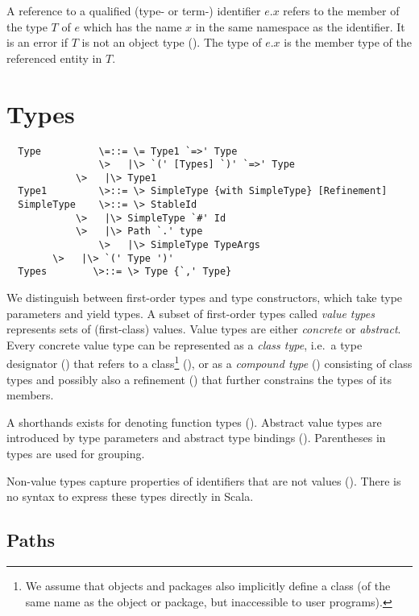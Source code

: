 \documentclass[11pt]{report}
\begin{document}
A reference to a qualified (type- or term-) identifier $e.x$ refers to
the member of the type $T$ of $e$ which has the name $x$ in the same
namespace as the identifier. It is an error if $T$ is not an object type
(). The type of $e.x$ is the member type of the
referenced entity in $T$.

\chapter{\label{sec:types}Types}

\syntax\begin{verbatim}
  Type          \=::= \= Type1 `=>' Type
                \>   |\> `(' [Types] `)' `=>' Type
	        \>   |\> Type1
  Type1         \>::= \> SimpleType {with SimpleType} [Refinement]
  SimpleType   	\>::= \> StableId
	        \>   |\> SimpleType `#' Id
	        \>   |\> Path `.' type
                \>   |\> SimpleType TypeArgs
		\>   |\> `(' Type ')'
  Types	       \>::= \> Type {`,' Type}
\end{verbatim}

We distinguish between first-order types and type constructors, which
take type parameters and yield types. A subset of first-order types
called {\em value types} represents sets of (first-class) values.
Value types are either {\em concrete} or {\em abstract}. Every
concrete value type can be represented as a {\em class type}, i.e.\ a
type designator () that refers to a 
class\footnote{We assume that objects and packages also
implicitly define a class (of the same name as the object or package,
but inaccessible to user programs).} (), 
or as a {\em compound type} () 
consisting of class types and possibly
also a refinement () that further constrains the
types of its members.

A shorthands exists for denoting function types
().  Abstract value types are introduced by
type parameters and abstract type bindings ().
Parentheses in types are used for grouping.

Non-value types capture properties of
identifiers that are not values
().  There is no syntax to express these
types directly in Scala.

\section{Paths}\label{sec:paths}
\end{document}
